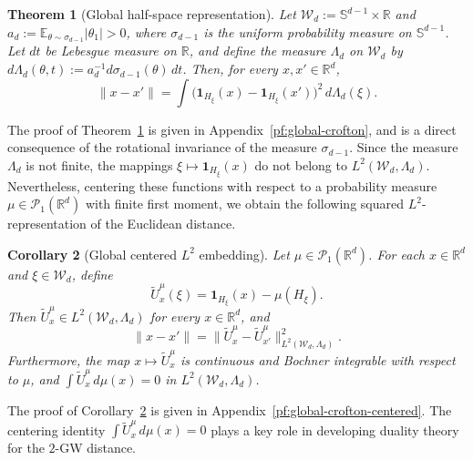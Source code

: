 \documentclass[11pt]{amsart}
\newtheorem{theorem}{Theorem}[section]
\newtheorem{corollary}[theorem]{Corollary}
\theoremstyle{definition}
\theoremstyle{remark}
\newcommand{\R}{\mathbb{R}}
\newcommand{\E}{\mathbb{E}}
\newcommand{\1}{\mathbf{1}}
\newcommand{\Sd}{\mathbb{S}}
\newcommand{\one}{\mathbf{1}}
\numberwithin{equation}{section}
\begin{document}
\begin{theorem}[Global half-space representation]
\label{theorem:global-crofton}
Let $\mathcal W_d:=\Sd^{d-1}\times\R$ and
$a_d:=\E_{\theta\sim\sigma_{d-1}}|\theta_1|>0$, where
$\sigma_{d-1}$ is the uniform probability measure on $\Sd^{d-1}$.
Let $dt$ be Lebesgue measure on $\R$, and define the
measure $\Lambda_d$ on $\mathcal W_d$ by
$d\Lambda_d(\theta,t):=a_d^{-1}d\sigma_{d-1}(\theta)\,dt$. Then, for
every $x,x'\in\R^d$,
\begin{equation}\label{eq:global-crofton}
\|x-x'\|
=
\int
\bigl(\one_{H_\xi}(x)-\one_{H_\xi}(x')\bigr)^2
\,d\Lambda_d(\xi).
\end{equation}
\end{theorem}

The proof of Theorem~\ref{theorem:global-crofton} is given in Appendix~\ref{pf:global-crofton}, and
is a direct consequence of the rotational invariance of the measure
$\sigma_{d-1}$. Since the measure $\Lambda_d$ is not finite, the mappings $\xi \mapsto \one_{H_\xi}(x)$ do not belong to $L^2(\mathcal{W}_d, \Lambda_d)$. Nevertheless, centering these functions with
respect to a probability measure $\mu \in \mathcal{P}_1(\R^d)$ with finite first moment, we obtain the following squared $L^2$-representation of the Euclidean distance.

\begin{corollary}[Global centered $L^2$ embedding]
\label{cor:global-crofton-centered}
Let $\mu\in\mathcal P_1(\R^d)$. For each $x\in \R^{d}$ and $\xi \in \mathcal{W}_d$, define
\begin{equation}\label{eq:global-centered-crofton}
\widetilde U_x^\mu(\xi)
=
\one_{H_\xi}(x)-\mu(H_\xi).
\end{equation}
Then $\widetilde U_x^\mu\in L^2(\mathcal W_d,\Lambda_d)$ for every
$x\in\R^d$, and 
\begin{equation}\label{eq:global-centeredl2embedding}
\|x-x'\|
=
\|\widetilde U_x^\mu-\widetilde U_{x'}^\mu\|^2_{L^2(\mathcal{W}_d, \Lambda_d)}.
\end{equation}
Furthermore, the map $x\mapsto \widetilde U_x^\mu$ is continuous and Bochner
integrable with respect to $\mu$, and
$\int \widetilde U_x^\mu\,d\mu(x)=0$ in $L^2(\mathcal{W}_d, \Lambda_d)$.
\end{corollary}
The proof of Corollary~\ref{cor:global-crofton-centered} is given in Appendix~\ref{pf:global-crofton-centered}. The centering identity $\int \widetilde U_x^\mu\,d\mu(x)=0$ plays a key role in developing duality theory for the $2$-GW distance.
\end{document}
